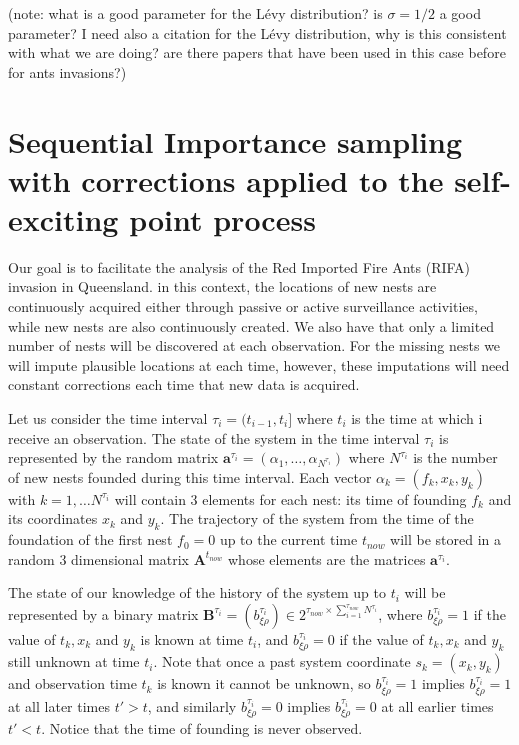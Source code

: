 \documentclass[11pt,a4paper]{article}
\renewcommand{\vec}[1]{\mathbf{#1}}
\begin{document}
{(note: what is a good parameter for the L\'evy distribution? is $\sigma = 1/2$ a good parameter? I need also a citation for the L\'evy distribution, why is this consistent with what we are doing? are there papers that have been used in this case before for ants invasions?)


\section{Sequential Importance sampling with corrections applied to the self-exciting point process}

Our goal is to facilitate the analysis of the Red Imported Fire Ants (RIFA) invasion in Queensland. in this context, the locations of new nests are continuously acquired either through passive or active surveillance activities, while new nests are also continuously created. We also have that only a limited number of nests will be discovered at each observation. For the missing nests we will impute plausible locations at each time, however, these imputations will need constant corrections each time that new data is acquired. 

Let us consider the time interval $\tau_i = (t_{i-1}, t_i]$ where $t_i$ is the time at which i receive an observation. The state of the system in the time interval $\tau_i$ is represented by the random matrix $\vec{a}^{\tau_i} = (\alpha_1, \dots, \alpha_{N^{\tau_i}})$ where $N^{\tau_i}$ is the number of new nests founded during this time interval. Each vector $\alpha_k = (f_k, x_k, y_k)$ with $k = 1, \dots N^{\tau_i}$ will contain 3 elements for each nest: its time of founding $f_k$ and its coordinates $x_k$ and $y_k$. The trajectory of the system from the time of the foundation of the first nest $f_0 = 0$ up to the current time $t_{now}$ will be stored in a random 3 dimensional matrix $\vec{A}^{t_{now}}$ whose elements are the matrices $\vec{a}^{\tau_i}$.

The state of our knowledge of the history of the system up to $t_{i}$ will be represented by a binary matrix $\vec{B}^{\tau_{i}} = (b^{\tau_i}_{\xi \rho}) \in 2^{\tau_{now} \times \sum_{i=1}^{\tau_{now}} N^{\tau_i}}$, where $b^{\tau_i}_{\xi \rho} = 1$ if the value of $t_k, x_k$ and $y_k$ is known at time $t_i$, and $b^{\tau_i}_{\xi \rho} = 0$ if the value of $t_k, x_k$ and $y_k$ still unknown at time $t_i$. Note that once a past system coordinate $s_k = (x_k, y_k)$ and observation time $t_k$ is known it cannot be unknown, so $b^{\tau_i}_{\xi \rho} = 1$ implies $b^{\tau_i}_{\xi \rho} = 1$ at all later times $t' > t$, and similarly $b^{\tau_i}_{\xi \rho} = 0$ implies $b^{\tau_i}_{\xi \rho} = 0$ at all earlier times $t' < t$. Notice that the time of founding is never observed.

}
\end{document}
